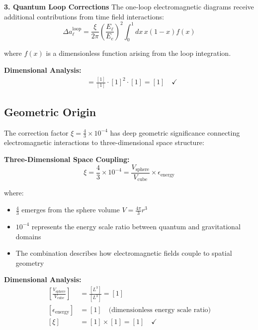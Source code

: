 \documentclass[12pt,a4paper]{report}
\begin{document}
	\textbf{3. Quantum Loop Corrections}
	The one-loop electromagnetic diagrams receive additional contributions from time field interactions:
	\begin{equation}
		\Delta a_\ell^{\text{loop}} = \frac{\xi}{2\pi} \left(\frac{E_\ell}{E_e}\right)^2 \int_0^1 dx \, x(1-x) f(x)
	\end{equation}
	
	where $f(x)$ is a dimensionless function arising from the loop integration.
	
	\textbf{Dimensional Analysis:}
	\begin{align}
		[\Delta a_\ell^{\text{loop}}] &= \frac{[1]}{[1]} \cdot [1]^2 \cdot [1] = [1] \quad \checkmark
	\end{align}
	
	\subsection{Geometric Origin}
	\label{subsec:geometric_origin}
	
	The correction factor $\xi = \frac{4}{3} \times 10^{-4}$ has deep geometric significance connecting electromagnetic interactions to three-dimensional space structure:
	
	\textbf{Three-Dimensional Space Coupling:}
	\begin{equation}
		\xi = \frac{4}{3} \times 10^{-4} = \frac{V_{\text{sphere}}}{V_{\text{cube}}} \times \epsilon_{\text{energy}}
	\end{equation}
	
	where:
	\begin{itemize}
		\item $\frac{4}{3}$ emerges from the sphere volume $V = \frac{4\pi}{3}r^3$
		\item $10^{-4}$ represents the energy scale ratio between quantum and gravitational domains
		\item The combination describes how electromagnetic fields couple to spatial geometry
	\end{itemize}
	
	\textbf{Dimensional Analysis:}
	\begin{align}
		\left[\frac{V_{\text{sphere}}}{V_{\text{cube}}}\right] &= \frac{[L^3]}{[L^3]} = [1] \\
		[\epsilon_{\text{energy}}] &= [1] \quad \text{(dimensionless energy scale ratio)} \\
		[\xi] &= [1] \times [1] = [1] \quad \checkmark
	\end{align}
	
\end{document}

